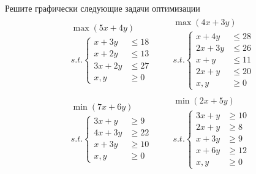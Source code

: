 \begin{exercise}
Решите графически следующие задачи оптимизации
\begin{align*}
	& \begin{gathered}
		\max(5x+4y) \\
		s.t.\left\{\begin{aligned}
			x+3y &\leqslant18 \\ x+2y &\leqslant13 \\ 
			3x+2y &\leqslant27 \\ x,y&\geqslant0
		\end{aligned}\right.
	\end{gathered} &
	& \begin{gathered}
		\max(4x+3y) \\
		s.t.\left\{\begin{aligned}
			x+4y &\leqslant 28 \\ 2x+3y &\leqslant 26 \\ 
			x+y &\leqslant 11 \\ 2x+y &\leqslant 20 \\ x,y&\geqslant0
		\end{aligned}\right.
	\end{gathered} \\
	& \begin{gathered}
		\min(7x+6y) \\
		s.t.\left\{\begin{aligned}
			3x+y &\geqslant 9 \\ 4x+3y &\geqslant 22 \\ 
			x+3y &\geqslant 10 \\ x,y&\geqslant0
		\end{aligned}\right.
	\end{gathered} &
	& \begin{gathered}
		\min(2x+5y) \\
		s.t.\left\{\begin{aligned}
			3x+y &\geqslant 10 \\ 2x+y &\geqslant 8 \\ 
			x+3y &\geqslant 9 \\ x+6y &\geqslant 12 \\ x,y&\geqslant0
		\end{aligned}\right.
	\end{gathered}
\end{align*}
\end{exercise}

